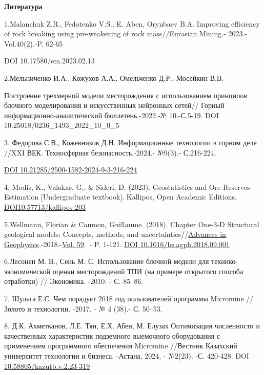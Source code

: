 \begin{center}
{\bfseries Литература}
\end{center}
\begin{references}

1.Malanchuk Z.R., Fedotenko V.S., E. Aben, Orynbaev B.A. Improving
efficiency of rock breaking using pre-weakening of rock mass//Eurasian
Mining.- 2023.-Vol.40(2).-P. 62-65

DOI 10.17580/em.2023.02.13

2.Мельниченко И.А., Кожухов А.А., Омельченко Д.Р., Мосейкин В.В.

Построение трехмерной модели месторождения с использованием принципов
блочного моделирования и искусственных нейронных сетей// Горный
информационно-аналитический бюллетень.-2022.-№ 10.-С.5-19. DOI
10.25018/0236\_1493\_2022\_10\_0\_5

3. Федорова С.В., Кожевников Д.Н. Информационные технологии в горном
деле //XXI ВЕК. Техносферная безопасность.-2024.- №9(3).- С.216-224.

\href{http://dx.doi.org/10.21285/2500-1582-2024-9-3-216-224}{DOI
10.21285/2500-1582-2024-9-3-216-224}

4. Modis, K., Valakas, G., \& Sideri, D. (2023). Geostatistics and Ore
Reserves Estimation {[}Undergraduate textbook{]}. Kallipos, Open
Academic Editions.
\href{http://dx.doi.org/10.57713/kallipos-203}{DOI10.57713/kallipos-203}

5.Wellmann, Florian \& Caumon, Guillaume. (2018). Chapter One-3-D
Structural geological models: Concepts, methods, and uncertainties//\href{https://www.sciencedirect.com/bookseries/advances-in-geophysics}{Advances
in Geophysics}.-2018.-\href{https://www.sciencedirect.com/bookseries/advances-in-geophysics/vol/59/suppl/C}{Vol.
59}.~- P. 1-121. \href{http://dx.doi.org/10.1016/bs.agph.2018.09.001}{DOI
10.1016/bs.agph.2018.09.001} 

6.Лесонен М. В., Сень М. С. Использование блочной модели для
технико-экономической оценки месторождений ТПИ (на примере открытого
способа отработки) // Экономика. -2010. - С. 85--86.

7. Шульга Е.С. Чем порадует 2018 год пользователей программы Micromine
// Золото и технологии. -2017. - № 4 (38).- С. 50--53.

8. Д.К. Ахметканов, Л.Е. Тян, Е.Х. Абен, М. Елузах Оптимизация
численности и качественных характеристик подземного выемочного
оборудования с применением программного обеспечения Micromine //Вестник
Казахский университет технологии и бизнеса. -Астана, 2024, - №2(23). -С.
420-428. DOI \href{https://doi.org/10.58805/kazutb.v.2.23-319}{10.58805/kazutb.v.2.23-319}


\end{references}
